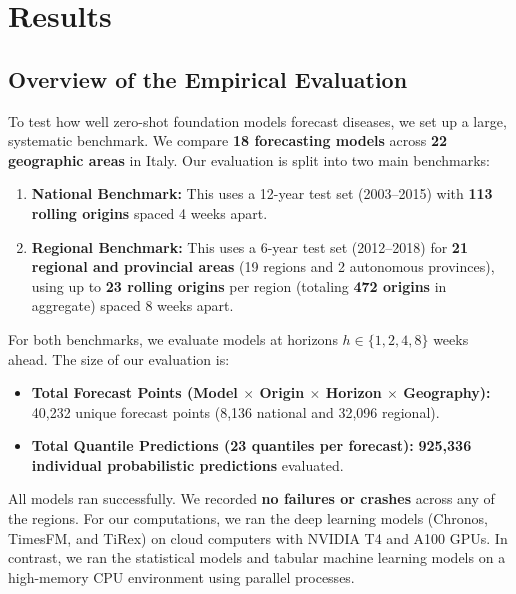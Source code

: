 
\chapter{Results}
\label{ch:results}


\section{Overview of the Empirical Evaluation}

To test how well zero-shot foundation models forecast diseases, we set up a large, systematic benchmark. We compare \textbf{18 forecasting models} across \textbf{22 geographic areas} in Italy. Our evaluation is split into two main benchmarks:
\begin{enumerate}
    \item \textbf{National Benchmark:} This uses a 12-year test set (2003--2015) with \textbf{113 rolling origins} spaced 4 weeks apart.
    \item \textbf{Regional Benchmark:} This uses a 6-year test set (2012--2018) for \textbf{21 regional and provincial areas} (19 regions and 2 autonomous provinces), using up to \textbf{23 rolling origins} per region (totaling \textbf{472 origins} in aggregate) spaced 8 weeks apart.
\end{enumerate}

For both benchmarks, we evaluate models at horizons $h \in \{1, 2, 4, 8\}$ weeks ahead. The size of our evaluation is:
\begin{itemize}
    \item \textbf{Total Forecast Points (Model $\times$ Origin $\times$ Horizon $\times$ Geography):} 40,232 unique forecast points (8,136 national and 32,096 regional).
    \item \textbf{Total Quantile Predictions (23 quantiles per forecast):} \textbf{925,336 individual probabilistic predictions} evaluated.
\end{itemize}

All models ran successfully. We recorded \textbf{no failures or crashes} across any of the regions. For our computations, we ran the deep learning models (Chronos, TimesFM, and TiRex) on cloud computers with NVIDIA T4 and A100 GPUs. In contrast, we ran the statistical models and tabular machine learning models on a high-memory CPU environment using parallel processes.

